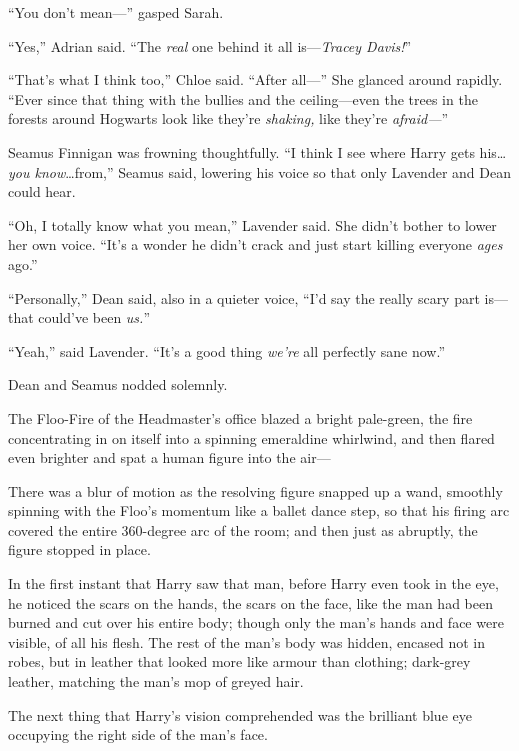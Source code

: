 “You don’t mean—” gasped Sarah.

“Yes,” Adrian said. “The \emph{real} one behind it all is—\emph{Tracey Davis!}”

“That’s what I think too,” Chloe said. “After all—” She glanced around rapidly. “Ever since that thing with the bullies and the ceiling—even the trees in the forests around Hogwarts look like they’re \emph{shaking,} like they’re \emph{afraid—}”

Seamus Finnigan was frowning thoughtfully. “I think I see where Harry gets his…\emph{you know}…from,” Seamus said, lowering his voice so that only Lavender and Dean could hear.

“Oh, I totally know what you mean,” Lavender said. She didn’t bother to lower her own voice. “It’s a wonder he didn’t crack and just start killing everyone \emph{ages} ago.”

“Personally,” Dean said, also in a quieter voice, “I’d say the really scary part is—that could’ve been \emph{us.}”

“Yeah,” said Lavender. “It’s a good thing \emph{we’re} all perfectly sane now.”

Dean and Seamus nodded solemnly.


The Floo-Fire of the Headmaster’s office blazed a bright pale-green, the fire concentrating in on itself into a spinning emeraldine whirlwind, and then flared even brighter and spat a human figure into the air—

There was a blur of motion as the resolving figure snapped up a wand, smoothly spinning with the Floo’s momentum like a ballet dance step, so that his firing arc covered the entire 360-degree arc of the room; and then just as abruptly, the figure stopped in place.

In the first instant that Harry saw that man, before Harry even took in the eye, he noticed the scars on the hands, the scars on the face, like the man had been burned and cut over his entire body; though only the man’s hands and face were visible, of all his flesh. The rest of the man’s body was hidden, encased not in robes, but in leather that looked more like armour than clothing; dark-grey leather, matching the man’s mop of greyed hair.

The next thing that Harry’s vision comprehended was the brilliant blue eye occupying the right side of the man’s face.

